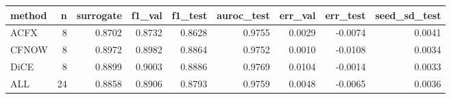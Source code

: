 \begin{tabular}{lrrrrrrrr}
\toprule
method &  n &  surrogate &  f1\_val &  f1\_test &  auroc\_test &  err\_val &  err\_test &  seed\_sd\_test \\
\midrule
  ACFX &  8 &     0.8702 &  0.8732 &   0.8628 &      0.9755 &   0.0029 &   -0.0074 &        0.0041 \\
 CFNOW &  8 &     0.8972 &  0.8982 &   0.8864 &      0.9752 &   0.0010 &   -0.0108 &        0.0034 \\
  DiCE &  8 &     0.8899 &  0.9003 &   0.8886 &      0.9769 &   0.0104 &   -0.0014 &        0.0033 \\
   ALL & 24 &     0.8858 &  0.8906 &   0.8793 &      0.9759 &   0.0048 &   -0.0065 &        0.0036 \\
\bottomrule
\end{tabular}

